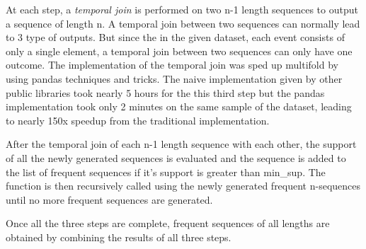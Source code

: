 At each step, a \textit{temporal join} is performed on two n-1 length sequences to output a sequence of length n. A temporal join between two sequences can normally lead to 3 type of outputs. But since the in the given dataset, each event consists of only a single element, a temporal join between two sequences can only have one outcome.
The implementation of the temporal join was sped up multifold by using pandas techniques and tricks. The naive implementation given by other public libraries took nearly 5 hours for the this third step but the pandas implementation took only 2 minutes on the same sample of the dataset, leading to nearly 150x speedup from the traditional implementation.

After the temporal join of each n-1 length sequence with each other, the support of all the newly generated sequences is evaluated and the sequence is added to the list of frequent sequences if it's support is greater than min\_sup. The function is then recursively called using the newly generated frequent n-sequences until no more frequent sequences are generated.


Once all the three steps are complete, frequent sequences of all lengths are obtained by combining the results of all three steps.